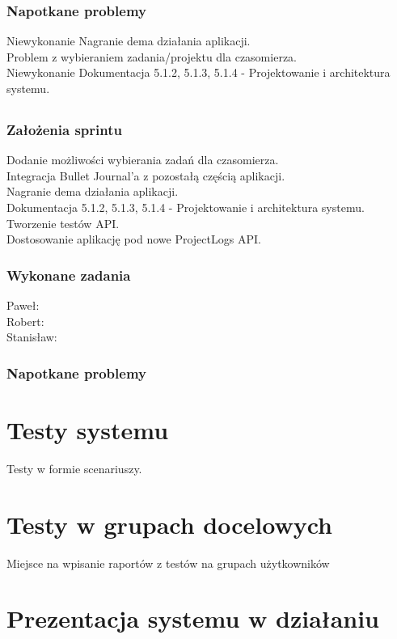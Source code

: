 \documentclass[a4paper,11pt]{report}
\begin{document}
\subsection {Napotkane problemy}
Niewykonanie Nagranie dema działania aplikacji.\\
Problem z wybieraniem zadania/projektu dla czasomierza.\\ 
Niewykonanie Dokumentacja 5.1.2, 5.1.3, 5.1.4 - Projektowanie i architektura systemu.\\


\section {}
\subsection {Założenia sprintu}
Dodanie możliwości wybierania zadań dla czasomierza.\\
Integracja Bullet Journal’a z pozostałą częścią aplikacji.\\
Nagranie dema działania aplikacji.\\
Dokumentacja 5.1.2, 5.1.3, 5.1.4 - Projektowanie i architektura systemu.\\
Tworzenie testów API.\\
Dostosowanie aplikację pod nowe ProjectLogs API.\\
\subsection {Wykonane zadania}
Paweł: \\
Robert: \\
Stanisław: \\
\subsection {Napotkane problemy}




\chapter {Testy systemu}
Testy w formie scenariuszy.
\chapter {Testy w grupach docelowych}
Miejsce na wpisanie raportów z testów na grupach użytkowników

\chapter{Prezentacja systemu w działaniu}
\end{document}
